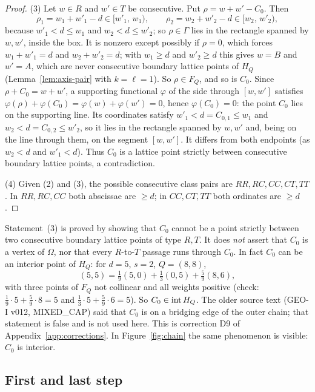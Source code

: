 \begin{proof}
(3) Let $w\in R$ and $w'\in T$ be consecutive. Put $\rho=w+w'-C_0$. Then
\[
  \rho_1=w_1+w'_1-d\in[w'_1,\,w_1),\qquad \rho_2=w_2+w'_2-d\in[w_2,\,w'_2),
\]
because $w'_1<d\le w_1$ and $w_2<d\le w'_2$; so $\rho\in\Gamma$ lies in the rectangle spanned by $w,w'$, inside the box. It is nonzero except possibly if $\rho=0$, which forces $w_1+w'_1=d$ and $w_2+w'_2=d$; with $w_1\ge d$ and $w'_2\ge d$ this gives $w=B$ and $w'=A$, which are never consecutive boundary lattice points of $H_Q$ (Lemma~\ref{lem:axis-pair} with $k=\ell=1$). So $\rho\in F_Q$, and so is $C_0$. Since $\rho+C_0=w+w'$, a supporting functional $\varphi$ of the side through $[w,w']$ satisfies $\varphi(\rho)+\varphi(C_0)=\varphi(w)+\varphi(w')=0$, hence $\varphi(C_0)=0$: the point $C_0$ lies on the supporting line. Its coordinates satisfy $w'_1<d=C_{0,1}\le w_1$ and $w_2<d=C_{0,2}\le w'_2$, so it lies in the rectangle spanned by $w,w'$ and, being on the line through them, on the segment $[w,w']$. It differs from both endpoints (as $w_2<d$ and $w'_1<d$). Thus $C_0$ is a lattice point strictly between consecutive boundary lattice points, a contradiction.

(4) Given (2) and (3), the possible consecutive class pairs are $RR,RC,CC,CT,TT$. In $RR,RC,CC$ both abscissae are $\ge d$; in $CC,CT,TT$ both ordinates are $\ge d$.
\end{proof}

\begin{remark}\label{rem:D9}
Statement~(3) is proved by showing that $C_0$ cannot be a point strictly between two consecutive boundary lattice points of type $R,T$. It does \emph{not} assert that $C_0$ is a vertex of $\Omega$, nor that every $R$-to-$T$ passage runs through $C_0$. In fact $C_0$ can be an interior point of $H_Q$: for $d=5$, $s=2$, $Q=(8,8)$,
\[
  (5,5)=\tfrac19(5,0)+\tfrac13(0,5)+\tfrac59(8,6),
\]
with three points of $F_Q$ not collinear and all weights positive (check: $\frac19\cdot5+\frac59\cdot8=5$ and $\frac13\cdot5+\frac59\cdot6=5$). So $C_0\in\operatorname{int} H_Q$. The older source text (GEO-I v012, MIXED\_CAP) said that $C_0$ is on a bridging edge of the outer chain; that statement is false and is not used here. This is correction D9 of Appendix~\ref{app:corrections}. In Figure~\ref{fig:chain} the same phenomenon is visible: $C_0$ is interior.
\end{remark}

\subsection{First and last step}

